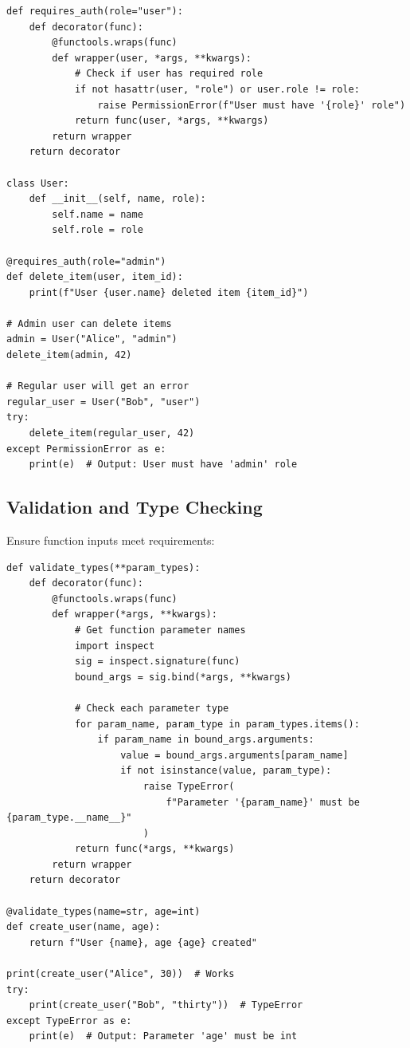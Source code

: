 \documentclass[12pt,letterpaper]{article}
\newenvironment{macterminal}{%
    \begin{mdframed}[
        linecolor=terminalFrame,
        backgroundcolor=terminalBg,
        roundcorner=5pt,
        skipabove=10pt,
        skipbelow=10pt,
        linewidth=1pt,
        innertopmargin=10pt, %
        frametitle={%
            \tikz[baseline=(current bounding box.east), outer sep=0pt]{
                \fill[red!80!black] (0,0) circle (5pt);
                \fill[yellow!80!black] (0.7,0) circle (5pt);
                \fill[green!70!black] (1.4,0) circle (5pt);
            }
        },
        frametitlealignment=\raggedright, %
        frametitleaboveskip=8pt, %
        frametitlebelowskip=0pt, %
    ]
}{%
    \end{mdframed}%
}
\begin{document}
\begin{macterminal}
\begin{lstlisting}
def requires_auth(role="user"):
    def decorator(func):
        @functools.wraps(func)
        def wrapper(user, *args, **kwargs):
            # Check if user has required role
            if not hasattr(user, "role") or user.role != role:
                raise PermissionError(f"User must have '{role}' role")
            return func(user, *args, **kwargs)
        return wrapper
    return decorator

class User:
    def __init__(self, name, role):
        self.name = name
        self.role = role

@requires_auth(role="admin")
def delete_item(user, item_id):
    print(f"User {user.name} deleted item {item_id}")

# Admin user can delete items
admin = User("Alice", "admin")
delete_item(admin, 42)

# Regular user will get an error
regular_user = User("Bob", "user")
try:
    delete_item(regular_user, 42)
except PermissionError as e:
    print(e)  # Output: User must have 'admin' role
\end{lstlisting}
\end{macterminal}

\subsection{Validation and Type Checking}

Ensure function inputs meet requirements:

\begin{macterminal}
\begin{lstlisting}
def validate_types(**param_types):
    def decorator(func):
        @functools.wraps(func)
        def wrapper(*args, **kwargs):
            # Get function parameter names
            import inspect
            sig = inspect.signature(func)
            bound_args = sig.bind(*args, **kwargs)
            
            # Check each parameter type
            for param_name, param_type in param_types.items():
                if param_name in bound_args.arguments:
                    value = bound_args.arguments[param_name]
                    if not isinstance(value, param_type):
                        raise TypeError(
                            f"Parameter '{param_name}' must be {param_type.__name__}"
                        )
            return func(*args, **kwargs)
        return wrapper
    return decorator

@validate_types(name=str, age=int)
def create_user(name, age):
    return f"User {name}, age {age} created"

print(create_user("Alice", 30))  # Works
try:
    print(create_user("Bob", "thirty"))  # TypeError
except TypeError as e:
    print(e)  # Output: Parameter 'age' must be int
\end{lstlisting}
\end{macterminal}
\end{document}

